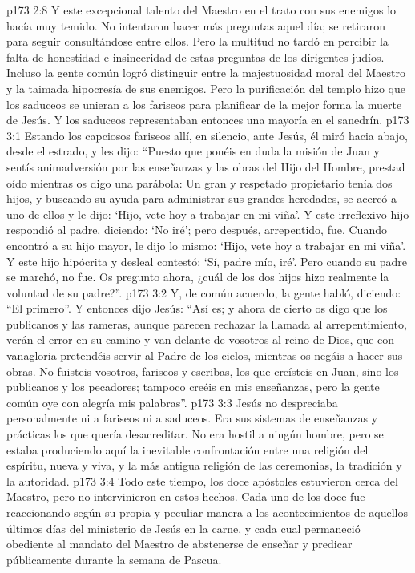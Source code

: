 \vs p173 2:8 Y este excepcional talento del Maestro en el trato con sus enemigos lo hacía muy temido. No intentaron hacer más preguntas aquel día; se retiraron para seguir consultándose entre ellos. Pero la multitud no tardó en percibir la falta de honestidad e insinceridad de estas preguntas de los dirigentes judíos. Incluso la gente común logró distinguir entre la majestuosidad moral del Maestro y la taimada hipocresía de sus enemigos. Pero la purificación del templo hizo que los saduceos se unieran a los fariseos para planificar de la mejor forma la muerte de Jesús. Y los saduceos representaban entonces una mayoría en el sanedrín.
\vs p173 3:1 Estando los capciosos fariseos allí, en silencio, ante Jesús, él miró hacia abajo, desde el estrado, y les dijo: “Puesto que ponéis en duda la misión de Juan y sentís animadversión por las enseñanzas y las obras del Hijo del Hombre, prestad oído mientras os digo una parábola: Un gran y respetado propietario tenía dos hijos, y buscando su ayuda para administrar sus grandes heredades, se acercó a uno de ellos y le dijo: ‘Hijo, vete hoy a trabajar en mi viña’. Y este irreflexivo hijo respondió al padre, diciendo: ‘No iré’; pero después, arrepentido, fue. Cuando encontró a su hijo mayor, le dijo lo mismo: ‘Hijo, vete hoy a trabajar en mi viña’. Y este hijo hipócrita y desleal contestó: ‘Sí, padre mío, iré’. Pero cuando su padre se marchó, no fue. Os pregunto ahora, ¿cuál de los dos hijos hizo realmente la voluntad de su padre?”.
\vs p173 3:2 Y, de común acuerdo, la gente habló, diciendo: “El primero”. Y entonces dijo Jesús: “Así es; y ahora de cierto os digo que los publicanos y las rameras, aunque parecen rechazar la llamada al arrepentimiento, verán el error en su camino y van delante de vosotros al reino de Dios, que con vanagloria pretendéis servir al Padre de los cielos, mientras os negáis a hacer sus obras. No fuisteis vosotros, fariseos y escribas, los que creísteis en Juan, sino los publicanos y los pecadores; tampoco creéis en mis enseñanzas, pero la gente común oye con alegría mis palabras”.
\vs p173 3:3 Jesús no despreciaba personalmente ni a fariseos ni a saduceos. Era sus sistemas de enseñanzas y prácticas los que quería desacreditar. No era hostil a ningún hombre, pero se estaba produciendo aquí la inevitable confrontación entre una religión del espíritu, nueva y viva, y la más antigua religión de las ceremonias, la tradición y la autoridad.
\vs p173 3:4 Todo este tiempo, los doce apóstoles estuvieron cerca del Maestro, pero no intervinieron en estos hechos. Cada uno de los doce fue reaccionando según su propia y peculiar manera a los acontecimientos de aquellos últimos días del ministerio de Jesús en la carne, y cada cual permaneció obediente al mandato del Maestro de abstenerse de enseñar y predicar públicamente durante la semana de Pascua.
